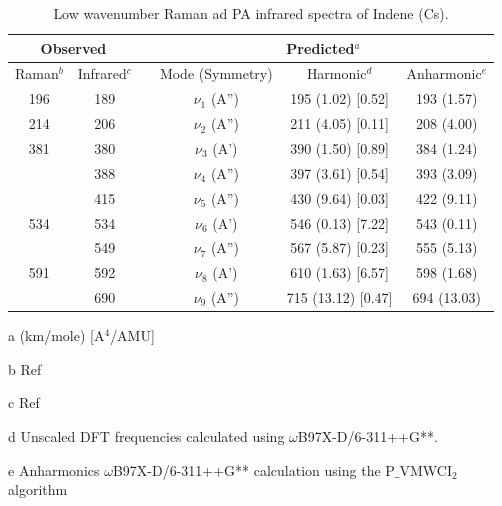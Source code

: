 \begin{table}[H]
	\caption{Low wavenumber Raman ad PA infrared spectra of Indene (Cs).}
	\begin{center}
		\begin{threeparttable}
			\begin{tabular}{c c c c c c}
				\hline
				\multicolumn{ 2}{c}{Observed} & \multicolumn{1}{c}{} & \multicolumn{ 3}{c}{Predicted$^{a}$} \\ \hline
				Raman$^{b}$ & \multicolumn{1}{c}{Infrared$^{c}$} &  & \multicolumn{1}{c}{Mode (Symmetry)} & \multicolumn{1}{c}{Harmonic$^{d}$} & Anharmonic$^{e}$ \\ \hline
196 & 189 &  & $\nu_{1}$ (A”) & 195 (1.02) [0.52] & 193 (1.57) \\ 
214 & \multicolumn{1}{c}{  206} &  & $\nu_{2}$ (A”) & 211 (4.05) [0.11] & 208 (4.00) \\ 
381 & \multicolumn{1}{c}{  380} &  & $\nu_{3}$ (A’) & 390 (1.50) [0.89] & 384 (1.24) \\ 
& \multicolumn{1}{c}{  388} &  & $\nu_{4}$ (A”)
& 397 (3.61) [0.54] & 393 (3.09)\\ 
& 415 &  & $\nu_{5}$ (A”) & 430 (9.64) [0.03] & 422 (9.11) \\ 
534 & 534 &  & $\nu_{6}$ (A’) & 546 (0.13) [7.22] & 543 (0.11) \\ 
& 549 &  & $\nu_{7}$ (A”) & 567 (5.87) [0.23] & 555 (5.13) \\ 
591 & 592 &  & $\nu_{8}$ (A’)& 610 (1.63) [6.57] & 598 (1.68)\\ 
& 690 &  & $\nu_{9}$ (A”) & 715 (13.12) [0.47] & 694 (13.03) \\ 
\bottomrule
\end{tabular}

\begin{tablenotes}
	\item[a] (km/mole) [A$^{4}$/AMU]
	\item[b] Ref \cite{klots1995vibrational}
	\item[c] Ref \cite{el1999dft}
	\item[d] Unscaled DFT frequencies calculated using $\omega$B97X-D/6-311++G**.
	\item[e] Anharmonics $\omega$B97X-D/6-311++G** calculation using the P$\_$VMWCI$_{2}$ algorithm
\end{tablenotes}
\end{threeparttable}
\end{center}
\label{lowfreq-Indene}
\end{table}




